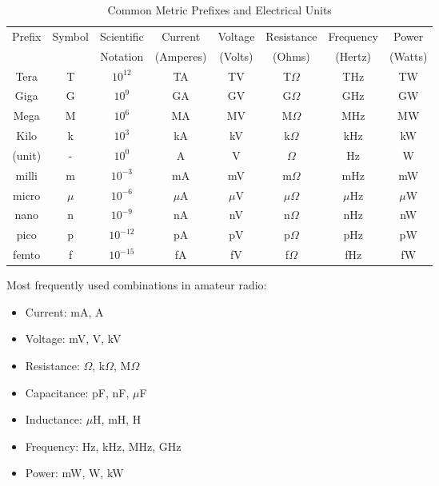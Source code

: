 
\begin{table}[htbp]
    \centering
    \caption{Common Metric Prefixes and Electrical Units}
    \label{tab:metric-prefixes}
    \scriptsize
    \begin{tabular}{|c|c|c|c|c|c|c|c|}
        \hline
        Prefix & Symbol & Scientific & Current & Voltage & Resistance & Frequency & Power \\
        & & Notation & (Amperes) & (Volts) & (Ohms) & (Hertz) & (Watts) \\
        \hline
        Tera & T & $10^{12}$ & TA & TV & T$\Omega$ & THz & TW \\
        Giga & G & $10^9$ & GA & GV & G$\Omega$ & GHz & GW \\
        Mega & M & $10^6$ & MA & MV & M$\Omega$ & MHz & MW \\
        Kilo & k & $10^3$ & kA & kV & k$\Omega$ & kHz & kW \\
        \hline
        (unit) & - & $10^0$ & A & V & $\Omega$ & Hz & W \\
        \hline
        milli & m & $10^{-3}$ & mA & mV & m$\Omega$ & mHz & mW \\
        micro & $\mu$ & $10^{-6}$ & $\mu$A & $\mu$V & $\mu\Omega$ & $\mu$Hz & $\mu$W \\
        nano & n & $10^{-9}$ & nA & nV & n$\Omega$ & nHz & nW \\
        pico & p & $10^{-12}$ & pA & pV & p$\Omega$ & pHz & pW \\
        femto & f & $10^{-15}$ & fA & fV & f$\Omega$ & fHz & fW \\
        \hline
    \end{tabular}
\end{table}

\begin{tcolorbox}[colback=gray!10!white,colframe=black!75!black,title={Common Usage}]
Most frequently used combinations in amateur radio:
\begin{itemize}[noitemsep]
    \item Current: mA, A
    \item Voltage: mV, V, kV
    \item Resistance: $\Omega$, k$\Omega$, M$\Omega$
    \item Capacitance: pF, nF, $\mu$F
    \item Inductance: $\mu$H, mH, H
    \item Frequency: Hz, kHz, MHz, GHz
    \item Power: mW, W, kW
\end{itemize}
\end{tcolorbox}

